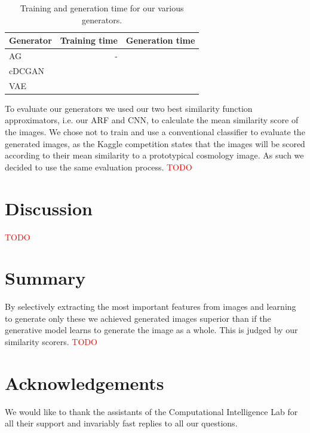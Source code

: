 \documentclass[10pt,conference,compsocconf]{IEEEtran}
\newcommand\TODO[1]{\textcolor{red}{#1}} %
\begin{document}
\begin{table}[htbp]
  \centering
  \begin{tabular}[c]{|l||r|r|}
    \hline
    Generator   & Training time & Generation time \\
    \hline
    AG          &  -            &       \\
    cDCGAN      &               &       \\
    VAE         &               &       \\
    \hline
  \end{tabular}
  \caption{Training and generation time for our various generators.}
  \label{tab:gen_time}
\end{table}

To evaluate our generators we used our two best similarity function approximators, i.e. our ARF and CNN, to calculate the mean similarity score of the images. We chose not to train and use a conventional classifier to evaluate the generated images, as the Kaggle competition states that the images will be scored according to their mean similarity to a prototypical cosmology image. As such we decided to use the same evaluation process.
\TODO{TODO}



\section{Discussion}
\TODO{TODO}

\section{Summary}
By selectively extracting the most important features from images and learning to generate only these we achieved generated images superior than if the generative model learns to generate the image as a whole. This is judged by our similarity scorers.
\TODO{TODO}



\section*{Acknowledgements}
We would like to thank the assistants of the Computational Intelligence Lab for all their support and invariably fast replies to all our questions.




\end{document}
